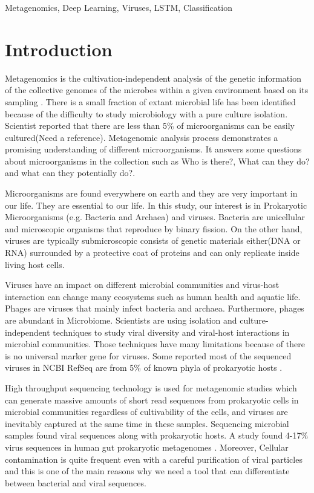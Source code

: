 \documentclass[conference]{IEEEtran}
\begin{document}
\begin{IEEEkeywords}
 Metagenomics, Deep Learning, Viruses, LSTM, Classification 
\end{IEEEkeywords}


\section{Introduction}

Metagenomics is the cultivation-independent analysis of the genetic information of the collective genomes of the microbes within a given environment based on its sampling \cite{izard2014metagenomics}. There is a small fraction of extant microbial life has been identified because of the difficulty to study microbiology with a pure culture isolation. Scientist reported that there are less than 5\% of microorganisms can be easily cultured(Need a reference). Metagenomic analysis process demonstrates a promising understanding of different microorganisms. It answers some questions about microorganisms in the collection such as Who is there?, What can they do? and what can they potentially do?.

Microorganisms are found everywhere on earth and they are very important in our life. They are essential to our life. In this study, our interest is in Prokaryotic Microorganisms
(e.g. Bacteria and Archaea) and viruses. Bacteria are unicellular and microscopic organisms that reproduce by binary fission. On the other hand, viruses are typically submicroscopic consists of genetic materials either(DNA or RNA) surrounded by a protective coat of proteins and can only replicate inside living host cells. 

Viruses have an impact on different microbial communities and virus-host interaction can change many ecosystems such as human health and aquatic life. Phages are viruses that mainly infect bacteria and archaea. Furthermore, phages are abundant in Microbiome. Scientists are using isolation and culture-independent techniques to study viral diversity and viral-host interactions in microbial communities. Those techniques have many limitations because of there is no universal marker gene for viruses. Some reported most of the sequenced viruses in NCBI RefSeq are from 5\% of known phyla of prokaryotic hosts \cite{roux2015viral}.

High throughput sequencing technology is used for metagenomic studies which can generate massive amounts of short read sequences from prokaryotic cells in microbial communities regardless of cultivability of the cells, and viruses are inevitably captured at the same time in these samples. Sequencing microbial samples found viral sequences along with prokaryotic hosts. A study found 4-17\% virus sequences in human gut prokaryotic metagenomes \cite{minot2011human}. Moreover, Cellular contamination is quite frequent even with a careful purification of viral particles and this is one of the main reasons why we need a tool that can differentiate between bacterial and viral sequences.
\end{document}
